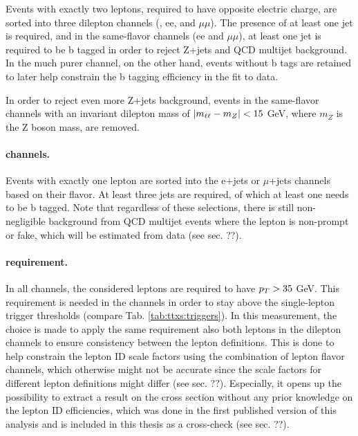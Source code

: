 Events with exactly two leptons, required to have opposite electric charge, are sorted into three dilepton channels (\emu, ee, and $\mu\mu$). The presence of at least one jet is required, and in the same-flavor channels (ee and $\mu\mu$), at least one jet is required to be b tagged in order to reject Z+jets and QCD multijet background. In the much purer \emu channel, on the other hand, events without b tags are retained to later help constrain the b tagging efficiency in the fit to data.

In order to reject even more Z+jets background, events in the same-flavor channels with an invariant dilepton mass of $| m_{\ell\ell} - m_Z | < 15$ GeV, where $m_Z$ is the Z boson mass, are removed.

\paragraph{\ljets channels.}

Events with exactly one lepton are sorted into the e+jets or $\mu$+jets channels based on their flavor. At least three jets are required, of which at least one needs to be b tagged. Note that regardless of these selections, there is still non-negligible background from QCD multijet events where the lepton is non-prompt or fake, which will be estimated from data (see sec. ??).

\paragraph{\pt requirement.}

In all channels, the considered leptons are required to have $p_T > 35$ GeV. This requirement is needed in the \ljets channels in order to stay above the single-lepton trigger \pt thresholds (compare Tab. \ref{tab:ttxs:triggers}). In this measurement, the choice is made to apply the same \pt requirement also both leptons in the dilepton channels to ensure consistency between the lepton definitions. This is done to help constrain the lepton ID scale factors using the combination of lepton flavor channels, which otherwise might not be accurate since the scale factors for different lepton definitions might differ (see sec. ??). Especially, it opens up the possibility to extract a result on the cross section without any prior knowledge on the lepton ID efficiencies, which was done in the first published version of this analysis \cite{CMS:TOP-22-012-PAS} and is included in this thesis as a cross-check (see sec. ??).

